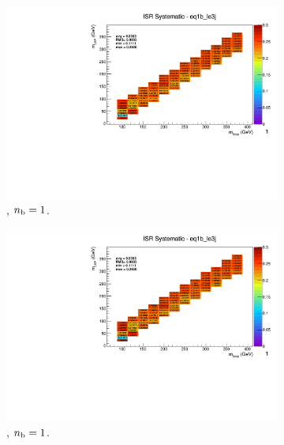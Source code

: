 \begin{figure}[ht!]
\begin{subfigure}[b]{0.32\textwidth}
    \includegraphics[width=\textwidth, page=8]{Figs/sms/t2degen/v19/systs/T2_4body_ISR_eq1b_le3j.pdf}
    \caption{\njlow, $n_{\text{b}} = 1$.}
  \end{subfigure}
  \begin{subfigure}[b]{0.32\textwidth}
    \includegraphics[width=\textwidth, page=1]{Figs/sms/t2degen/v19/systs/T2_4body_ISR_eq1b_le3j.pdf}
    \caption{\njlow, $n_{\text{b}} = 1$.}
  \end{subfigure}\\
  \begin{subfigure}[b]{0.32\textwidth}

\end{subfigure}
\end{figure}
